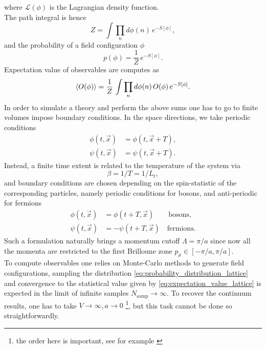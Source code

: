 where $\mathcal{L}(\phi)$ is the Lagrangian density function.  \\
The path integral is hence
\begin{equation*}
    Z = \int \prod_n d\phi(n) \, e^{-S[\phi]},
\end{equation*}
and the probability of a field configuration $\phi$
\begin{equation}
    p(\phi) = \frac{1}{Z} \, e^{-S[\phi]}.
    \label{eq:probability_distribution_lattice}
\end{equation}
Expectation value of observables are computes as
\begin{equation}
    \left\langle O(\phi) \right\rangle  = \frac{1}{Z} \, \int \prod_n d\phi(n) \, O(\phi) \, e^{-S[\phi]}.
    \label{eq:expectation_value_lattice}
\end{equation}
In order to simulate a theory and perform the above sums one has to go to finite volumes impose boundary conditions. In the space directions, we take periodic conditions 
\begin{equation*}
    \begin{aligned}
        \phi(t, \vec x) &= \phi(t, \vec x + T), \\
        \psi(t, \vec x) &= \psi(t, \vec x + T).
    \end{aligned}
\end{equation*}
Instead, a finite time extent is related to the temperature of the system \cite{le_bellac_1996,rothe_LGT} via
\begin{equation*}
    \beta = 1/T = 1/L_t,
\end{equation*}
and boundary conditions are chosen depending on the spin-statistic of the corresponding particles, namely periodic conditions for bosons, and anti-periodic for fermions
\begin{equation*}
    \begin{aligned}
        \phi(t, \vec x) &= \phi(t + T, \vec x) \qquad \text{bosons}, \\
        \psi(t, \vec x) &= -\psi(t + T, \vec x) \quad \text{fermions}.
    \end{aligned}
\end{equation*}
Such a formulation naturally brings a momentum cutoff $\Lambda = \pi/a$ since now all the momenta are restricted to the first Brilloune zone $p_\mu \in [-\pi/a, \pi/a]$. \\
To compute observables one relies on Monte-Carlo methods to generate field configurations, sampling the distribution \eqref{eq:probability_distribution_lattice} and convergence to the statistical value given by \eqref{eq:expectation_value_lattice} is expected in the limit of infinite samples $N_\text{samp} \to \infty$. To recover the continuum results, one has to take $V \to \infty, a \to 0$ \footnote{the order here is important, see for example \cite{seiler,friedli_velenik_2017}}, but this task cannot be done so straightforwardly.
